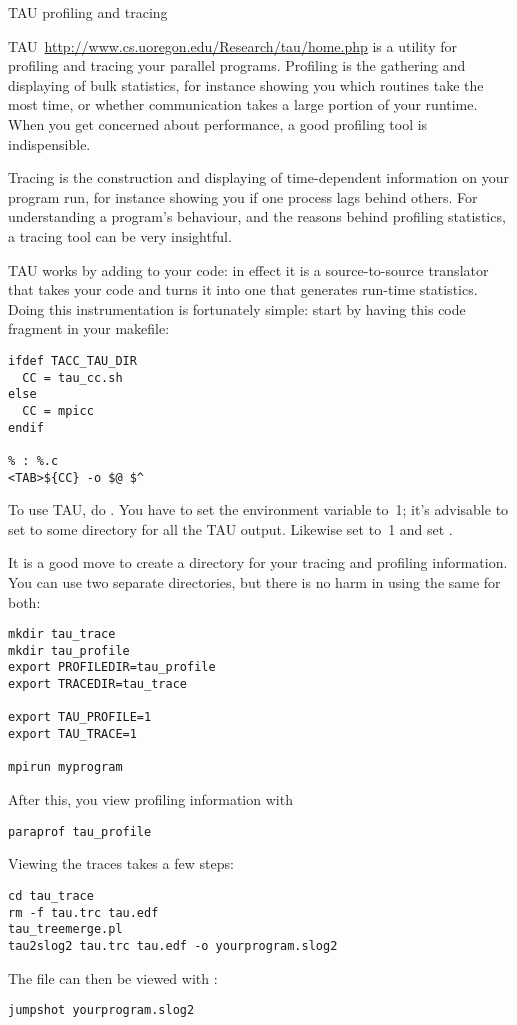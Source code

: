  {TAU profiling and tracing}

TAU~\url{http://www.cs.uoregon.edu/Research/tau/home.php} is a utility
for profiling and tracing your parallel programs. Profiling is the
gathering and displaying of bulk statistics, for instance showing you
which routines take the most time, or whether communication takes a
large portion of your runtime. When you get concerned about
performance, a good profiling tool is indispensible.

Tracing is the construction and displaying of time-dependent
information on  your program run, for instance showing you if one
process lags behind others. For understanding a program's behaviour,
and the reasons behind profiling statistics, a tracing tool can be
very insightful.

TAU works by adding  to your code: in
effect it is a source-to-source translator that takes your code and
turns it into one that generates run-time statistics. Doing this
instrumentation is fortunately simple: start by having this code
fragment in your makefile:
\begin{verbatim}
ifdef TACC_TAU_DIR
  CC = tau_cc.sh
else
  CC = mpicc
endif

% : %.c
<TAB>${CC} -o $@ $^
\end{verbatim}

\begin{istc}
To use TAU, do . You have to set the environment
variable  to~1; it's advisable to set  to some directory 
for all the TAU output. Likewise set  to~1 and set .
\end{istc}

It is a good move to create a directory for your tracing and profiling
information. You can use two separate directories, but there is no
harm in using the same for both:
\begin{verbatim}
mkdir tau_trace
mkdir tau_profile
export PROFILEDIR=tau_profile
export TRACEDIR=tau_trace

export TAU_PROFILE=1
export TAU_TRACE=1

mpirun myprogram
\end{verbatim}

After this, you view profiling information with 
\begin{verbatim}
paraprof tau_profile
\end{verbatim}
Viewing the traces takes a few steps:
\begin{verbatim}
cd tau_trace
rm -f tau.trc tau.edf
tau_treemerge.pl
tau2slog2 tau.trc tau.edf -o yourprogram.slog2 
\end{verbatim}
The  file can then be viewed with :
\begin{verbatim}
jumpshot yourprogram.slog2
\end{verbatim}

